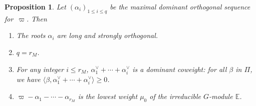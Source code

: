 \documentclass[JEP,XML,SOM,Unicode,NoFloatCountersInSection]{cedram}
\let\oldvee\vee
\renewcommand{\vee}{{\scriptscriptstyle\oldvee}}
\theoremstyle{plain}
\newtheorem{prop}[theo]{Proposition}
\theoremstyle{definition}
\let\la\langle
\let\ra\rangle
\newcommand{\bE}{\mathbb{E}}
\newcommand{\rkm}{{r_M}}
\begin{document}
\begin{prop}
\label{prop:cascade}
Let $(\alpha_i)_{1 \leq i \leq q}$ be the maximal dominant orthogonal sequence for~$\varpi$. Then
\begin{enumerate}
\item\label{prop:cascade1}
The roots $\alpha_i$ are long and strongly orthogonal.
\item\label{prop:cascade2}
$q=\rkm$.
\item\label{prop:cascade3}
For any integer $i \leq \rkm$, $\alpha_1^\vee + \cdots + \alpha_i^\vee$ is a dominant coweight:
for all $\beta$ in $\Pi$, we have $\la \beta, \alpha_1^\vee + \cdots + \alpha_i^\vee\ra\geq 0$.
\item\label{prop:cascade4}
$\varpi - \alpha_1 - \cdots - \alpha_\rkm$ is the lowest weight $\mu_0$ of the irreducible
$G$-module $\bE$.
\end{enumerate}
\end{prop}
\end{document}
